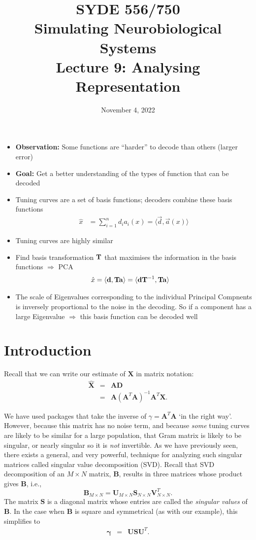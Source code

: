 \documentclass[10pt,letterpaper,oneside]{article}
\date{November 4, 2022}
\title{SYDE 556/750 \\ Simulating Neurobiological Systems \\ Lecture 9: Analysing Representation}
\begin{document}



\begin{itemize}
	\item \textbf{Observation:} Some functions are \enquote{harder} to decode than others (larger error)
	\item \textbf{Goal:} Get a better understanding of the types of function that can be decoded
	\item Tuning curves are a set of basis functions; decoders combine these basis functions
	\begin{align*}
		\hat x &= \sum_{i = 1}^n d_i a_i(x) = \langle \vec d, \vec a(x) \rangle
	\end{align*}
	\item Tuning curves are highly similar
	\item Find basis transformation ${\mathbf{T}}$ that maximises the information in the basis functions $\Rightarrow$ PCA
	\begin{align*}
		\hat x &= \langle {\mathbf{d}}, {\mathbf{T}} {\mathbf{a}} \rangle = \langle {\mathbf{d}} {\mathbf{T}}^{-1}, {\mathbf{T}} {\mathbf{a}} \rangle
	\end{align*}
	\item The scale of Eigenvalues corresponding to the individual Principal Compnents is inversely proportional to the noise in the decoding. So if a component has a large Eigenvalue $\Rightarrow$ this basis function can be decoded well
\end{itemize}

\section{Introduction}

Recall that we can write our estimate of $\mathbf{X}$ in matrix notation:
\begin{eqnarray*}
  \hat{\mathbf{X}} & = & \mathbf{A}\mathbf{D}\\
   & = & \mathbf{A}(\mathbf{A}^{T}\mathbf{A})^{-1}\mathbf{A}^{T}\mathbf{X}.
\end{eqnarray*}

We have used packages that take the inverse of $\gamma = \mathbf{A}^{T}\mathbf{A}$ `in the right way'. However, because this matrix has no noise term, and because \emph{some} tuning curves are likely to be similar for a large population, that Gram matrix is likely to be singular, or nearly singular
so it is \emph{not} invertible. As we have previously seen, there exists a general, and very powerful, technique for analyzing
such singular matrices called singular value decomposition (SVD).
Recall that SVD decomposition of an $M\times N$ matrix, $\mathbf{B}$, results in three matrices whose product gives $\mathbf{B}$, i.e.,
\[
\mathbf{B}_{M\times N}=\mathbf{U}_{M\times N}\mathbf{S}_{N\times N}\mathbf{V}_{N\times N}^{T}.
\]
The matrix $\mathbf{S}$ is a diagonal matrix whose entries are called
the \emph{singular values} of $\mathbf{B}$. In the case when $\mathbf{B}$ is square and symmetrical (as with our example), this simplifies to
\begin{eqnarray*}
\boldsymbol{\gamma} & = & \mathbf{USU}^{T}.
\end{eqnarray*}
\end{document}

